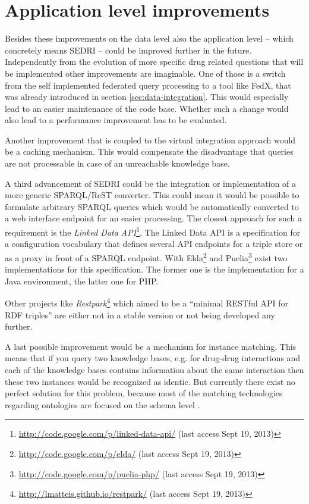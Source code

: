 \section*{Application level improvements}
\label{sec:impr-appl-level}

Besides these improvements on the data level also the application level -- which concretely means SEDRI -- could be improved further in the future.
Independently from the evolution of more specific drug related questions that will be implemented other improvements are imaginable.
One of those is a switch from the self implemented federated query processing to a tool like FedX, that was already introduced in section \ref{sec:data-integration}.
This would especially lead to an easier maintenance of the code base.
Whether such a change would also lead to a performance improvement has to be evaluated.

Another improvement that is coupled to the virtual integration approach would be a caching mechanism.
This would compensate the disadvantage that queries are not processable in case of an unreachable knowledge base.

A third advancement of SEDRI could be the integration or implementation of a more generic SPARQL/ReST converter.
This could mean it would be possible to formulate arbitrary SPARQL queries which would be automatically converted to a web interface endpoint for an easier processing.
The closest approach for such a requirement is the \textit{Linked Data API}\footnote{\url{http://code.google.com/p/linked-data-api/} (last access Sept 19, 2013)}.
The Linked Data API is a specification for a configuration vocabulary that defines several API endpoints for a triple store or as a proxy in front of a SPARQL endpoint.
With Elda\footnote{\url{http://code.google.com/p/elda/} (last access Sept 19, 2013)} and Puelia\footnote{\url{http://code.google.com/p/puelia-php/} (last access Sept 19, 2013)} exist two implementations for this specification.
The former one is the implementation for a Java environment, the latter one for PHP.

Other projects like \textit{Restpark}\footnote{\url{http://lmatteis.github.io/restpark/} (last access Sept 19, 2013)} which aimed to be a ``minimal RESTful API for RDF triples'' are either not in a stable version or not being developed any further.

A last possible improvement would be a mechanism for instance matching.
This means that if you query two knowledge bases, e.g. for drug-drug interactions and each of the knowledge bases contains information about the same interaction then these two instances would be recognized as identic.
But currently there exist no perfect solution for this problem, because most of the matching technologies regarding ontologies are focused on the schema level \cite{castano2008ontology}.

